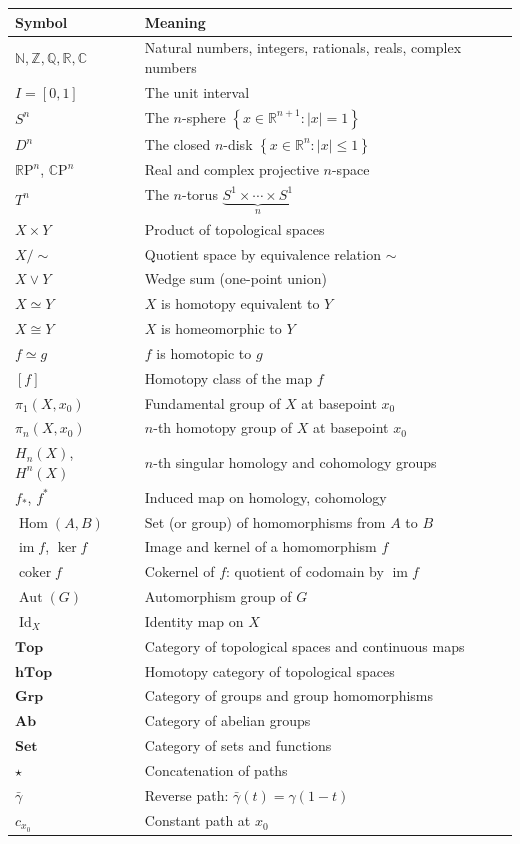 \documentclass[12pt,a4paper,openany]{book}
\theoremstyle{definition}
\theoremstyle{plain}
\theoremstyle{remark}
\newcommand{\N}{\mathbb{N}}
\newcommand{\Z}{\mathbb{Z}}
\newcommand{\Q}{\mathbb{Q}}
\newcommand{\R}{\mathbb{R}}
\newcommand{\C}{\mathbb{C}}
\newcommand{\RP}{\mathbb{R}\mathrm{P}}
\newcommand{\CP}{\mathbb{C}\mathrm{P}}
\DeclareMathOperator{\Hom}{Hom}
\DeclareMathOperator{\im}{im}
\DeclareMathOperator{\coker}{coker}
\DeclareMathOperator{\Aut}{Aut}
\DeclareMathOperator{\Id}{Id}
\newcommand{\abs}[1]{\left|#1\right|}
\newcommand{\set}[1]{\left\{#1\right\}}
\begin{document}
\begin{longtable}{>{\raggedright\arraybackslash}p{3.8cm} p{9.5cm}}
\toprule
\textbf{Symbol} & \textbf{Meaning} \\
\midrule
\endhead
$\N, \Z, \Q, \R, \C$ & Natural numbers, integers, rationals, reals, complex numbers \\[4pt]
$I = [0,1]$ & The unit interval \\[4pt]
$S^n$ & The $n$-sphere $\set{x \in \R^{n+1} : \abs{x} = 1}$ \\[4pt]
$D^n$ & The closed $n$-disk $\set{x \in \R^n : \abs{x} \le 1}$ \\[4pt]
$\RP^n$, $\CP^n$ & Real and complex projective $n$-space \\[4pt]
$T^n$ & The $n$-torus $\underbrace{S^1 \times \cdots \times S^1}_{n}$ \\[4pt]
$X \times Y$ & Product of topological spaces \\[4pt]
$X / {\sim}$ & Quotient space by equivalence relation $\sim$ \\[4pt]
$X \vee Y$ & Wedge sum (one-point union) \\[4pt]
$X \simeq Y$ & $X$ is homotopy equivalent to $Y$ \\[4pt]
$X \cong Y$ & $X$ is homeomorphic to $Y$ \\[4pt]
$f \simeq g$ & $f$ is homotopic to $g$ \\[4pt]
$[f]$ & Homotopy class of the map $f$ \\[4pt]
$\pi_1(X, x_0)$ & Fundamental group of $X$ at basepoint $x_0$ \\[4pt]
$\pi_n(X, x_0)$ & $n$-th homotopy group of $X$ at basepoint $x_0$ \\[4pt]
$H_n(X)$, $H^n(X)$ & $n$-th singular homology and cohomology groups \\[4pt]
$f_*$, $f^*$ & Induced map on homology, cohomology \\[4pt]
$\Hom(A, B)$ & Set (or group) of homomorphisms from $A$ to $B$ \\[4pt]
$\im f$, $\ker f$ & Image and kernel of a homomorphism $f$ \\[4pt]
$\coker f$ & Cokernel of $f$: quotient of codomain by $\im f$ \\[4pt]
$\Aut(G)$ & Automorphism group of $G$ \\[4pt]
$\Id_X$ & Identity map on $X$ \\[4pt]
$\mathbf{Top}$ & Category of topological spaces and continuous maps \\[4pt]
$\mathbf{hTop}$ & Homotopy category of topological spaces \\[4pt]
$\mathbf{Grp}$ & Category of groups and group homomorphisms \\[4pt]
$\mathbf{Ab}$ & Category of abelian groups \\[4pt]
$\mathbf{Set}$ & Category of sets and functions \\[4pt]
$\star$ & Concatenation of paths \\[4pt]
$\bar{\gamma}$ & Reverse path: $\bar{\gamma}(t) = \gamma(1-t)$ \\[4pt]
$c_{x_0}$ & Constant path at $x_0$ \\[4pt]
\bottomrule
\end{longtable}
\end{document}
